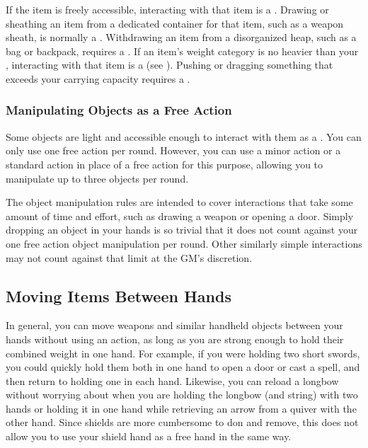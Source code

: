     \begin{raggeditemize}
       If the item is freely accessible, interacting with that item is a .
        Drawing or sheathing an item from a dedicated container for that item, such as a weapon sheath, is normally a .
        Withdrawing an item from a disorganized heap, such as a bag or backpack, requires a .
       If an item's weight category is no heavier than your , interacting with that item is a  (see ).
        Pushing or dragging something that exceeds your carrying capacity requires a .
    \end{raggeditemize}

    \subsubsection{Manipulating Objects as a Free Action}
      Some objects are light and accessible enough to interact with them as a .
      You can only use one free action  per round.
      However, you can use a minor action or a standard action in place of a free action for this purpose, allowing you to manipulate up to three objects per round.

      The object manipulation rules are intended to cover interactions that take some amount of time and effort, such as drawing a weapon or opening a door.
      Simply dropping an object in your hands is so trivial that it does not count against your one free action object manipulation per round.
      Other similarly simple interactions may not count against that limit at the GM's discretion.

  \subsection{Moving Items Between Hands}\label{Moving Items Between Hands}
    In general, you can move weapons and similar handheld objects between your hands without using an action, as long as you are strong enough to hold their combined weight in one hand.
    For example, if you were holding two short swords, you could quickly hold them both in one hand to open a door or cast a spell, and then return to holding one in each hand.
    Likewise, you can reload a longbow without worrying about when you are holding the longbow (and string) with two hands or holding it in one hand while retrieving an arrow from a quiver with the other hand.
    Since shields are more cumbersome to don and remove, this does not allow you to use your shield hand as a free hand in the same way.

